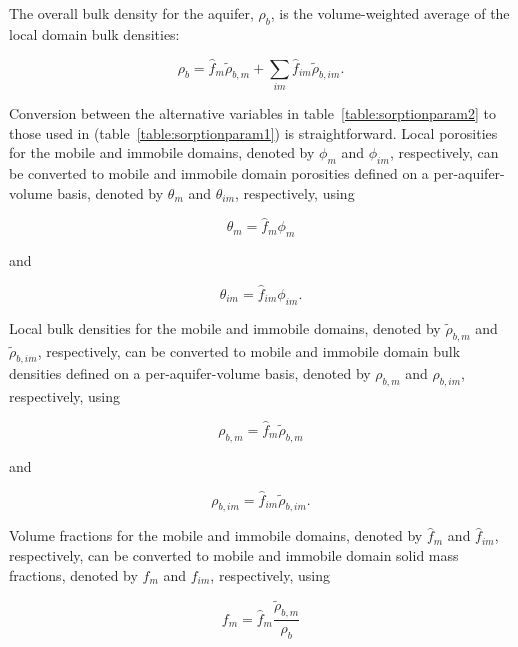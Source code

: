 \noindent The overall bulk density for the aquifer, $\rho_b$, is the volume-weighted average of the local domain bulk densities:

\begin{equation}
\label{eqn:rhob2}
\rho_{b} = \hat{f}_m \tilde{\rho}_{b, m} + \sum_{im}{\hat{f}_{im} \tilde{\rho}_{b, im}}.
\end{equation}

Conversion between the alternative variables in table~\ref{table:sorptionparam2} to those used in \mf (table~\ref{table:sorptionparam1}) is straightforward.  Local porosities for the mobile and immobile domains, denoted by $\phi_m$ and $\phi_{im}$, respectively, can be converted to mobile and immobile domain porosities defined on a per-aquifer-volume basis, denoted by $\theta_m$ and $\theta_{im}$, respectively, using

\begin{equation}
\label{eqn:theta1}
\theta_{m} = \hat{f}_{m} \phi_{m}
\end{equation}

\noindent and

\begin{equation}
\label{eqn:theta2}
\theta_{im} = \hat{f}_{im} \phi_{im}.
\end{equation}

\noindent Local bulk densities for the mobile and immobile domains, denoted by $\tilde{\rho}_{b, m}$ and $\tilde{\rho}_{b, im}$, respectively, can be converted to mobile and immobile domain bulk densities defined on a per-aquifer-volume basis, denoted by $\rho_{b, m}$ and $\rho_{b, im}$, respectively, using

\begin{equation}
\label{eqn:rhobm}
\rho_{b,m} = \hat{f}_m \tilde{\rho}_{b, m}
\end{equation}

\noindent and

\begin{equation}
\label{eqn:rhobim}
\rho_{b, im} = \hat{f}_{im} \tilde{\rho}_{b, im}.
\end{equation}

\noindent Volume fractions for the mobile and immobile domains, denoted by $\hat{f}_{m}$ and $\hat{f}_{im}$, respectively, can be converted to mobile and immobile domain solid mass fractions, denoted by $f_{m}$ and $f_{im}$, respectively, using

\begin{equation}
\label{eqn:fmfm}
f_{m} = \hat{f}_m \frac{\tilde{\rho}_{b, m}}{\rho_{b}}
\end{equation}

